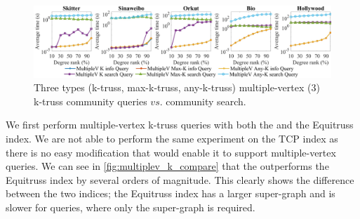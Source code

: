 \begin{figure}
    \centering
    \includegraphics[width=0.9\linewidth, trim={0cm 0cm, 0cm, 0.2cm}, clip]{./figures/multiplev_3_info_query_small.jpg}
		\vspace{-0.2cm}
    \caption{Three types (k-truss, max-k-truss, any-k-truss) multiple-vertex ($3$) \toplevelprob{} k-truss community queries $vs.$ community search.}
    \label{fig:multiplev_3_info_query}
		\vspace{-0.5cm}
\end{figure}



We first perform \toplevelprob{} multiple-vertex k-truss queries with both the \twolevelindex{} and the Equitruss index. We are not able to perform the same experiment on the TCP index as there is no easy modification that would enable it to support multiple-vertex queries. We can see in \autoref{fig:multiplev_k_compare} that the \twolevelindex{} outperforms the Equitruss index by several orders of magnitude. This clearly shows the difference between the two indices; the Equitruss index has a larger super-graph and is slower for \toplevelprob{} queries, where only the super-graph is required. %

